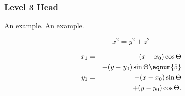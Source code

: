 \documentclass[draft,agums]{aguplus}
\begin{document}
\begin{article}

%
%
%

\subsubsection{Level 3 Head} An example.   An
example.

%
%

%
%
 \begin{equation}
 x^2=y^2 + z^2
 \end{equation}


\begin{eqnarray}
  x_{1} & = & (x - x_{0}) \cos \Theta \nonumber \\
        && + (y - y_{0}) \sin \Theta  \eqnum{5} \\
  y_{1} & = & -(x - x_{0}) \sin \Theta \nonumber \\
        && + (y - y_{0}) \cos \Theta. \nonumber
\end{eqnarray}


\end{article}
\end{document}
